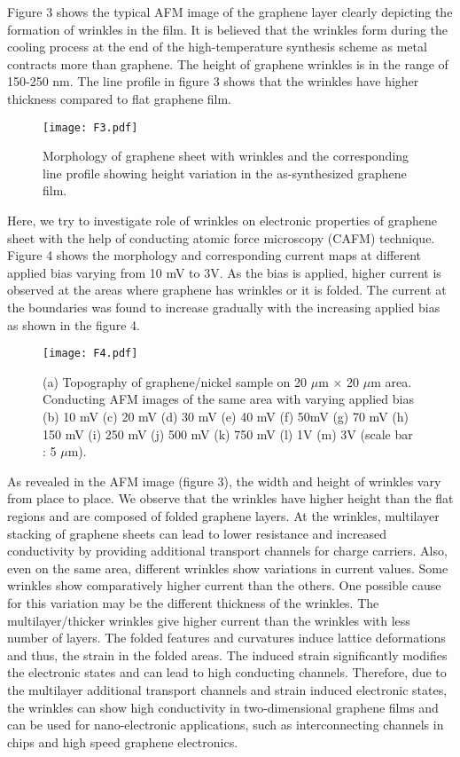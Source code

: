 \documentclass[preprint,aps,preprint,amsmath,amssymb]{revtex4-1}
\begin{document}
Figure 3 shows the typical AFM image of the graphene layer clearly depicting the formation of wrinkles in the film. It is believed that the wrinkles form during the cooling process at the end of the high-temperature synthesis scheme as metal contracts more than graphene. The height of graphene wrinkles is in the range of 150-250 nm. The line profile in figure 3 shows that the wrinkles have higher thickness compared to flat graphene film.

\begin{figure}[h!]
	
	\texttt{[image: F3.pdf]}
	\caption{Morphology of graphene sheet with wrinkles and the corresponding line profile showing height variation in the as-synthesized graphene film.}
	\label{s1}
\end{figure}

Here, we try to investigate role of wrinkles on electronic properties of graphene sheet with the help of conducting atomic force microscopy (CAFM) technique. Figure 4 shows the morphology and corresponding current maps at different applied bias varying from 10 mV to 3V.  As the bias is applied, higher current is observed at the areas where graphene has wrinkles or it is folded. The current at the boundaries was found to increase gradually with the increasing applied bias as shown in the figure 4.
\begin{figure}[h!]
	
	\texttt{[image: F4.pdf]}
	\caption{(a) Topography of graphene/nickel sample on 20 $\mu$m × 20 $\mu$m area. Conducting AFM images of the same area with varying applied bias (b) 10 mV (c) 20 mV (d) 30 mV (e) 40 mV (f) 50mV (g) 70 mV (h) 150 mV (i) 250 mV (j) 500 mV (k) 750 mV (l) 1V (m) 3V (scale bar : 5 $\mu$m).}
	\label{s1}
\end{figure}

As revealed in the AFM image (figure 3), the width and height of wrinkles vary from place to place. We observe that the wrinkles have higher height than the flat regions and are composed of folded graphene layers. At the wrinkles, multilayer stacking of graphene sheets can lead to lower resistance and increased conductivity by providing additional transport channels for charge carriers. Also, even on the same area, different wrinkles show variations in current values. Some wrinkles show comparatively higher current than the others. One possible cause for this variation may be the different thickness of the wrinkles. The multilayer/thicker wrinkles give higher current than the wrinkles with less number of layers. The folded features and curvatures induce lattice deformations and thus, the strain in the folded areas. The induced strain significantly modifies the electronic states and can lead to high conducting channels.\cite{Castro} Therefore, due to the multilayer additional transport channels and strain induced electronic states, the wrinkles can show high conductivity in two-dimensional graphene films and can be used for nano-electronic applications, such as interconnecting channels in chips and high speed graphene electronics.
\end{document}
